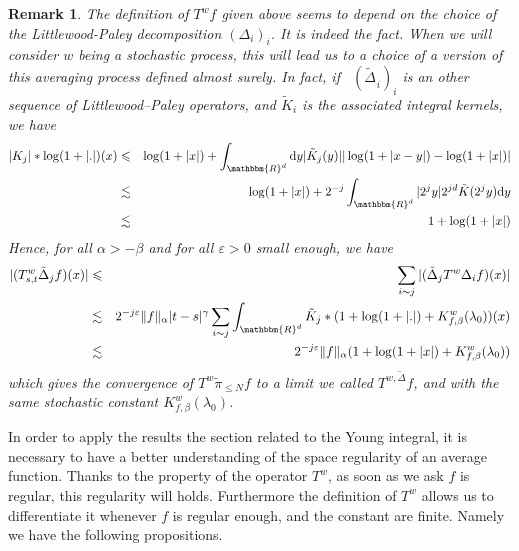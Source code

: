 \documentclass[a4paper,11pt]{article}
\newcommand{\mathd}{\mathrm{d}}
\newcommand{\nocomma}{}
\newtheorem{remark}[theorem]{Remark}
\begin{document}
\begin{remark}
  The definition of $T^{w} f$ given above seems to depend on the choice of the
  Littlewood-Paley decomposition $( \Delta_{i} )_{i}$. It is indeed the fact.
  When we will consider $w$ being a stochastic process, this will lead us to a
  choice of a version of this averaging process defined almost surely. In
  fact, if \ $( \widetilde{\Delta_{}}_{i} )_{i}$ is an other sequence of
  Littlewood--Paley operators, and $\tilde{K}_{i}$ is the associated integral
  kernels, we have
  \begin{eqnarray*}
    | K_{j} | \ast \log ( 1+ | . | ) ( x ) & \leqslant & \log ( 1+ | x | ) +
    \int_{\mathbbm{R}^{d}} \mathd y  | \tilde{K}_{j} ( y ) | | \log ( 1+ | x-y
    | ) - \log ( 1+ | x | ) |\\
    & \lesssim & \log ( 1+ | x | ) +2^{-j} \int_{\mathbbm{R}^{d}} | 2^{j} y |
    2^{j d} \tilde{K} ( 2^{j} y ) \mathd y\\
    & \lesssim & 1+ \log ( 1+ | x | )
  \end{eqnarray*}
  Hence, for all $\alpha >- \beta$ and for all $\varepsilon >0$ small enough,
  we have
  \begin{eqnarray*}
    | ( T^{w}_{s,t} \tilde{\Delta}_{j} f ) ( x ) | & \leqslant & \sum_{i \sim
    j} | ( \tilde{\Delta}_{j} T^{w} \Delta_{i} f ) ( x ) |\\
    & \lesssim & 2^{-j \varepsilon} \| f \|_{\alpha} | t-s |^{\gamma} \sum_{i
    \sim j} \int_{\mathbbm{R}^{d}} \tilde{K}_{j} \ast ( 1+ \log ( 1+ | . | )
    +K_{f, \beta}^{w} ( \lambda_{0} ) ) ( x )\\
    & \lesssim & 2^{-j \varepsilon} \| f \|_{\alpha} ( 1+ \log ( 1+ | x | )
    +K_{f, \beta}^{w} ( \lambda_{0} ) )
  \end{eqnarray*}
  which gives the convergence of $T^{w} \tilde{\pi}_{\leqslant N} f$ to a
  limit we called $T^{w \nocomma , \tilde{\Delta}} f$, and with the same
  stochastic constant $K_{f, \beta}^{w} ( \lambda_{0} )$.
\end{remark}

In order to apply the results the section related to the Young integral, it is
necessary to have a better understanding of the space regularity of an average
function. Thanks to the property of the operator $T^{w}$, as soon as we ask
$f$ is regular, this regularity will holds. Furthermore the definition of
$T^{w}$ allows us to differentiate it whenever $f$ is regular enough, and the
constant are finite. Namely we have the following propositions.
\end{document}
